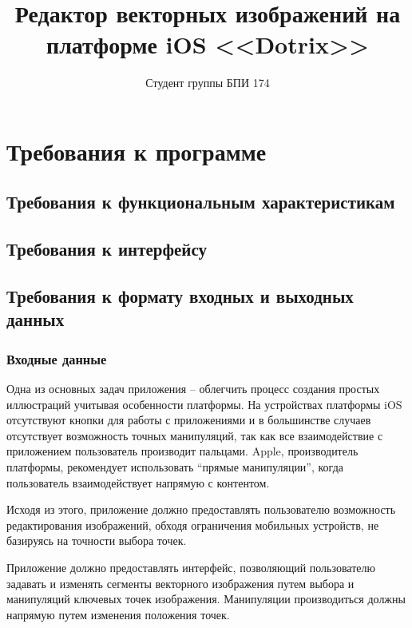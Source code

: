 \documentclass{../TechDoc}
\title{Редактор векторных изображений на платформе iOS <<Dotrix>>}
\author{Студент группы БПИ 174}{И. И. Костюченко}
\begin{document}
    \maketitle
    
    \tableofcontents
    
    
    
    

    \section{Требования к программе}
    
    \subsection{Требования к функциональным характеристикам}
    
    
        
    \subsection{Требования к интерфейсу}
        
    

    \subsection{Требования к формату входных и выходных данных}
    
    \subsubsection{Входные данные}

    Одна из основных задач приложения -- облегчить процесс создания простых иллюстраций учитывая особенности платформы. На устройствах платформы iOS отсутствуют кнопки для работы с приложениями и в большинстве случаев отсутствует возможность точных манипуляций, так как все взаимодействие с приложением пользователь производит пальцами. Apple, производитель платформы, рекомендует использовать ``прямые манипуляции'', когда пользователь взаимодействует напрямую с контентом.
    
    Исходя из этого, приложение должно предоставлять пользователю возможность редактирования изображений, обходя ограничения мобильных устройств, не базируясь на точности выбора точек.

    Приложение должно предоставлять интерфейс, позволяющий пользователю задавать и изменять сегменты векторного изображения путем выбора и манипуляций ключевых точек изображения. Манипуляции производиться должны напрямую путем изменения положения точек.
\end{document}
